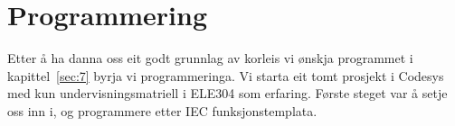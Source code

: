 \chapter{Programmering}
\thispagestyle{fancy}
Etter å ha danna oss eit godt grunnlag av korleis vi ønskja programmet i kapittel~\ref{sec:7} 
byrja vi programmeringa. \newline
Vi starta eit tomt prosjekt i \gls{Codesys} med kun undervisningsmatriell i ELE304 som erfaring. \citep{Olav} \citep{Olav2} \newline
Første steget var å setje oss inn i, og programmere etter \gls{IEC} funksjonstemplata.


